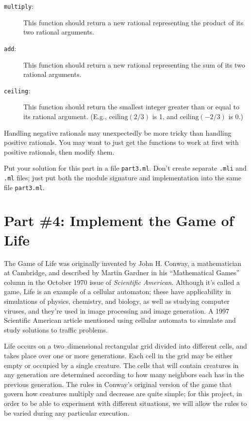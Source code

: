 \documentclass[11pt]{article}
\begin{document}
\begin{description}
      \item[\texttt{\textmd{multiply}}:] This function should return a new
            rational representing the product of its two rational
            arguments.

      \item[\texttt{\textmd{add}}:] This function should return a new
            rational representing the sum of its two rational
            arguments.

      \item[\texttt{\textmd{ceiling}}:] This function should return the
            smallest integer greater than or equal to its rational
            argument.  (E.g., $\mathrm{ceiling}(2/3)$ is 1, and
            $\mathrm{ceiling}(-2/3)$ is 0.)

    \end{description}

    \vspace{-1.5mm}

    \noindent
    Handling negative rationals may unexpectedly be more tricky than handling
  positive rationals.  You may want to just get the functions to work at
  first with positive rationals, then modify them.

    Put your solution for this part in a file \texttt{part3.ml}.  Don't create
  separate \texttt{.mli} and \texttt{.ml} files; just put both the module
  signature and implementation into the same file \texttt{part3.ml}.

  \section{Part \#4: Implement the Game of Life\label{section:life}}

    The Game of Life was originally invented by John H. Conway, a
  mathematician at Cambridge, and described by Martin Gardner in his
  ``Mathematical Games'' column in the October 1970 issue of
  \emph{Scientific American}.  Although it's called a game, Life is an
  example of a cellular automaton; these have applicability in simulations
  of physics, chemistry, and biology, as well as studying computer viruses,
  and they're used in image processing and image generation.  A 1997
  Scientific American article mentioned using cellular automata to simulate
  and study solutions to traffic problems.

    Life occurs on a two--dimensional rectangular grid divided into different
  cells, and takes place over one or more generations.  Each cell in the
  grid may be either empty or occupied by a single creature.  The cells that
  will contain creatures in any generation are determined according to how
  many neighbors each has in the previous generation.  The rules in Conway's
  original version of the game that govern how creatures multiply and
  decrease are quite simple; for this project, in order to be able to
  experiment with different situations, we will allow the rules to be varied
  during any particular execution.
\end{document}
